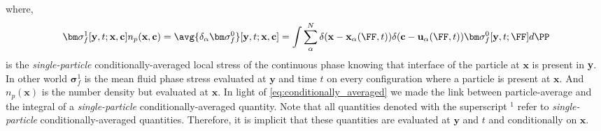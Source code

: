 where, 
\begin{equation*}
    \bm\sigma^1_f[\textbf{y},t;\textbf{x},\textbf{c}] n_p(\textbf{x},\textbf{c})
    =
    \avg{\delta_\alpha \bm\sigma^0_f}[\textbf{y},t;\textbf{x},\textbf{c}]
    = 
    \int 
    \sum_\alpha^N 
    \delta(\textbf{x} - \textbf{x}_\alpha(\FF,t))
    \delta(\textbf{c} - \textbf{u}_\alpha(\FF,t))
    \bm\sigma_f^0[\textbf{y},t;\FF]
    d\PP
\end{equation*}
is the \textit{single-particle} conditionally-averaged local stress of the continuous phase knowing that interface of the particle at $\textbf{x}$ is  present in \textbf{y}. 
In other world $\bm\sigma^1_f$ is the mean fluid phase stress evaluated at $\textbf{y}$ and time $t$ on every configuration where a particle is present at $\textbf{x}$. 
And $n_p(\textbf{x})$ is the number density but evaluated at $\textbf{x}$.
In light of \ref{eq:conditionally_averaged} we made the link between particle-average and the integral of a \textit{single-particle} conditionally-averaged quantity. 
Note that all quantities denoted with the superscript $^1$ refer to \textit{single-particle} conditionally-averaged  quantities.  
Therefore, it is implicit that these quantities are evaluated at $\textbf{y}$ and $t$ and conditionally on $\textbf{x}$. 

